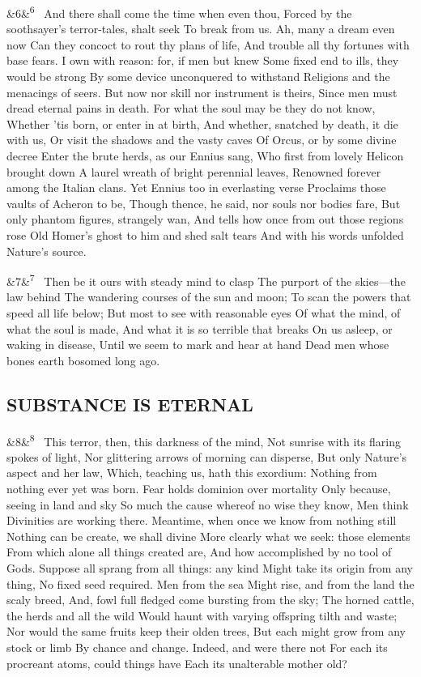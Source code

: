 \documentclass[12pt]{article}
\newcommand{\para}[1][]{\par\noindent\ifx&#1&\else\textsuperscript{\footnotesize #1}~\fi}
\begin{document}
\para[6] And there shall come the time when even thou, Forced by the soothsayer's terror-tales, shalt seek To break from us. Ah, many a dream even now Can they concoct to rout thy plans of life, And trouble all thy fortunes with base fears. I own with reason: for, if men but knew Some fixed end to ills, they would be strong By some device unconquered to withstand Religions and the menacings of seers. But now nor skill nor instrument is theirs, Since men must dread eternal pains in death. For what the soul may be they do not know, Whether 'tis born, or enter in at birth, And whether, snatched by death, it die with us, Or visit the shadows and the vasty caves Of Orcus, or by some divine decree Enter the brute herds, as our Ennius sang, Who first from lovely Helicon brought down A laurel wreath of bright perennial leaves, Renowned forever among the Italian clans. Yet Ennius too in everlasting verse Proclaims those vaults of Acheron to be, Though thence, he said, nor souls nor bodies fare, But only phantom figures, strangely wan, And tells how once from out those regions rose Old Homer's ghost to him and shed salt tears And with his words unfolded Nature's source.

\para[7] Then be it ours with steady mind to clasp The purport of the skies---the law behind The wandering courses of the sun and moon; To scan the powers that speed all life below; But most to see with reasonable eyes Of what the mind, of what the soul is made, And what it is so terrible that breaks On us asleep, or waking in disease, Until we seem to mark and hear at hand Dead men whose bones earth bosomed long ago.

\subsection*{SUBSTANCE IS ETERNAL}

\para[8] This terror, then, this darkness of the mind, Not sunrise with its flaring spokes of light, Nor glittering arrows of morning can disperse, But only Nature's aspect and her law, Which, teaching us, hath this exordium: Nothing from nothing ever yet was born. Fear holds dominion over mortality Only because, seeing in land and sky So much the cause whereof no wise they know, Men think Divinities are working there. Meantime, when once we know from nothing still Nothing can be create, we shall divine More clearly what we seek: those elements From which alone all things created are, And how accomplished by no tool of Gods. Suppose all sprang from all things: any kind Might take its origin from any thing, No fixed seed required. Men from the sea Might rise, and from the land the scaly breed, And, fowl full fledged come bursting from the sky; The horned cattle, the herds and all the wild Would haunt with varying offspring tilth and waste; Nor would the same fruits keep their olden trees, But each might grow from any stock or limb By chance and change. Indeed, and were there not For each its procreant atoms, could things have Each its unalterable mother old?
\end{document}

